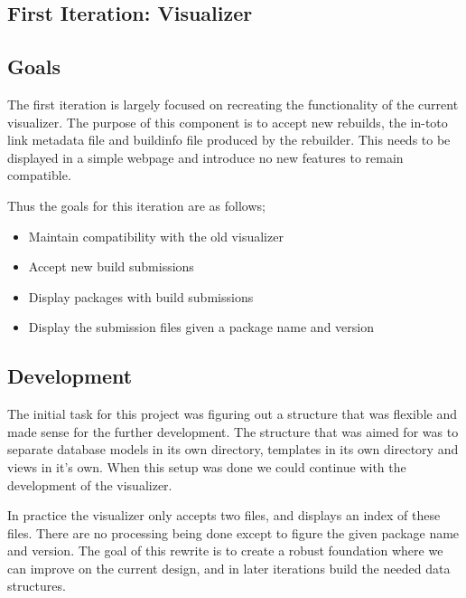 \documentclass[../Main/thesis.tex]{subfiles}
\begin{document}
\subsection{First Iteration: Visualizer}%
\label{sec:visualizer}

\subsection*{Goals}%
\label{sub:first_iteration_goals}
The first iteration is largely focused on recreating the functionality of the
current visualizer. The purpose of this component is to accept new rebuilds, the
in-toto link metadata file and buildinfo file produced by the rebuilder. This
needs to be displayed in a simple webpage and introduce no new features to
remain compatible.

Thus the goals for this iteration are as follows;

\begin{itemize}
    \item Maintain compatibility with the old visualizer
    \item Accept new build submissions
    \item Display packages with build submissions
    \item Display the submission files given a package name and version
\end{itemize}

\subsection*{Development}%
\label{sub:first_iteration_development}
The initial task for this project was figuring out a structure that was flexible
and made sense for the further development. The structure that was aimed for was
to separate database models in its own directory, templates in its own directory
and views in it's own. When this setup was done we could continue with the
development of the visualizer.

In practice the visualizer only accepts two files, and displays an index of
these files. There are no processing being done except to figure the given
package name and version. The goal of this rewrite is to create a robust
foundation where we can improve on the current design, and in later iterations
build the needed data structures.
\end{document}
